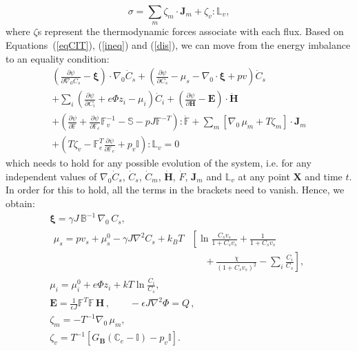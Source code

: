 \documentclass[runningheads]{llncs}
\newcommand{\F}{\ensuremath{\mathbb{F}}}
\newcommand{\LL}{\ensuremath{\mathbb{L}}}
\begin{document}
\begin{equation}
\sigma = \sum_m \zeta_m \cdot \mathbf{J}_m + \zeta_v : \LL_v,
\label{dis}
\end{equation}
where $\zeta$s represent the thermodynamic forces associate with each flux.
Based on Equations~(\ref{eqCIT}), (\ref{ineq}) and (\ref{dis}), we can move from the energy imbalance to an equality condition:
\begin{equation}
\begin{aligned}
\left(\frac{\partial \psi}{\partial \nabla_0 C_s}-\boldsymbol{\xi}\right) \cdot \nabla_0 \dot{C}_s + \left(\frac{\partial \psi}{\partial C_s}-\mu_s-\nabla_0 \cdot \boldsymbol{\xi}+p v\right)\dot{C}_s\\
+ \sum_i\left(\frac{\partial \psi}{\partial C_i} + e\Phi z_i-\mu_i\right) \dot{C}_i +\left(\frac{\partial \psi}{\partial \mathbf{H}}-\mathbf{E}\right) \cdot \dot{\mathbf{H}}\\
+ \left(\frac{\partial \psi}{\partial \F} + \frac{\partial \psi}{\partial\F_e}\F_v^{-1}- \mathbb{S} - p J \F^{-T}\right): \dot{\F}+ \sum_m \left[\nabla_0 \,\mu_m + T\zeta_m\right]\cdot \mathbf{J}_m \\
+\left(T\zeta_v - \F_e^T\frac{\partial \psi}{\partial \F_e}+p_v\mathbb{I}\right):\mathbb{L}_v=0
\end{aligned} 
\end{equation}
which needs to hold for any possible evolution of the system, i.e. for any independent values of $\nabla_0 \dot{C}_s$, $\dot{C}_s$, $\dot{C}_m$, $\dot{\mathbf{H}}$, $\dot{F}$, $\mathbf{J}_m$ and $\LL_v$ at any point $\mathbf{X}$ and time $t$. In order for this to hold, all the terms in the brackets need to vanish. Hence, we obtain:
\begin{gather}
\boldsymbol{\xi} = \gamma J \,\mathbb{B}^{-1} \,\nabla_0 \,C_s,\\[2mm]\label{sys1}
\begin{aligned}
\mu_s = p v_s + \mu_s^0 - \gamma J \nabla^2 C_s + k_BT&\left[\ln \frac{C_s v_s}{1+C_s v_s} + \frac{1}{1+C_sv_s}\right.\\
&\left.\ \ \ \ \ \ +\frac{\chi}{(1+C_s v_s)^2}-\sum_i \frac{C_i}{C_s}\right], 
\end{aligned}\\[2.5mm]
\mu_i = \mu^0_i + e\Phi z_i + kT \ln \frac{C_i}{C_s},\\
\mathbf{E} = \frac{1}{\epsilon J} \F^T \F\, \mathbf{H}\, , \qquad -\epsilon J \nabla^2 \Phi = Q\, ,\\[3mm]\label{sys2}
\zeta_m =-T^{-1} \nabla_0 \,\mu_m,\\
\zeta_v = T^{-1} \left[G_\mathbf{B} (\mathbb{C}_e-\mathbb{I})-p_v\mathbb{I}\right].\label{vflow1}
\end{gather}
\end{document}
